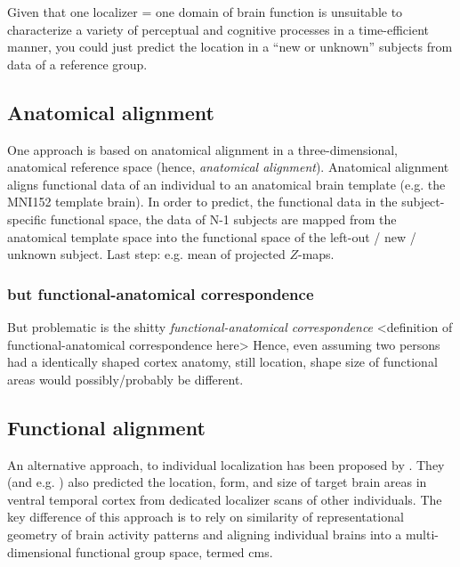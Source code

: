 Given that one localizer = one domain of brain function is unsuitable to
characterize a variety of perceptual and cognitive processes in a time-efficient
manner, you could just predict the location in a ``new or  unknown'' subjects
from data of a reference group.


\subsection{Anatomical alignment}



One approach is based on anatomical alignment in a three-dimensional, anatomical
reference space (hence, \textit{anatomical alignment}).
%
Anatomical alignment aligns functional data of an individual to an anatomical
brain template (e.g. the MNI152 template brain).
%
In order to predict, the functional data in the subject-specific functional
space, the data of N-1 subjects are mapped from the anatomical template space
into the functional space of the left-out / new / unknown subject.
%
Last step: e.g. mean of projected $Z$-maps.


\subsubsection{but functional-anatomical correspondence}
But problematic is the shitty \textit{functional-anatomical correspondence}
<definition of functional-anatomical correspondence here>
Hence, even assuming two persons had a identically shaped cortex anatomy, still
location, shape size of functional areas would possibly/probably be different.

%


\subsection{Functional alignment}
%
An alternative approach, to individual localization has been proposed by
\citet{haxby2011common}.
%
They (and e.g. \citet{jiahui2019predicting}) also predicted the location, form,
and size of target brain areas in ventral temporal cortex from dedicated
localizer scans of other individuals.
%
The key difference of this approach is to rely on similarity of representational
geometry of brain activity patterns and aligning individual brains into a
multi-dimensional functional group space, termed \ac{cms}.

